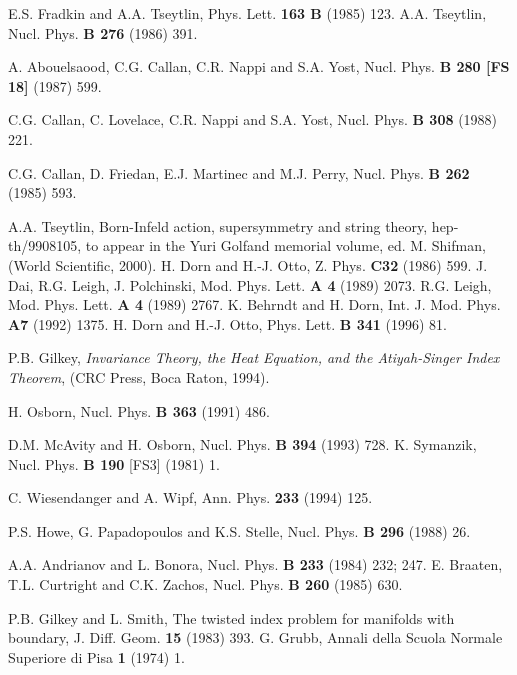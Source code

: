 \documentclass[a4paper,12pt]{article}
\begin{document}
\begin{thebibliography}{99}

E.S. Fradkin and A.A. Tseytlin, 
Phys. Lett. \textbf{163 B} (1985) 123. 
 A.A. Tseytlin, Nucl. Phys. \textbf{B 276} (1986) 391.

 A. Abouelsaood, C.G. Callan, C.R. Nappi and S.A. Yost, 
Nucl. Phys. \textbf{B
280 {[}FS 18{]}} (1987) 599.

C.G. Callan, C. Lovelace, C.R. Nappi and S.A. Yost,
Nucl. Phys. {\bf B 308} (1988) 221.

C.G. Callan, D. Friedan, E.J. Martinec and M.J. Perry, 
Nucl. Phys. \textbf{B 262} (1985) 593. 

A.A. Tseytlin, Born-Infeld action, 
supersymmetry and string theory, hep-th/9908105,
to appear in the Yuri Golfand memorial volume, ed. M. Shifman, 
(World Scientific,
2000).
H. Dorn and H.-J. Otto, Z. Phys. {\bf C32} (1986) 599.
J. Dai, R.G. Leigh, J. Polchinski, Mod. Phys. Lett. {\bf A 4}
(1989) 2073.
R.G. Leigh, Mod. Phys. Lett. {\bf A 4} (1989) 2767.
K. Behrndt and H. Dorn, Int. J. Mod. Phys. {\bf A7}
(1992) 1375.
H. Dorn and H.-J. Otto, Phys. Lett. {\bf B 341} (1996) 81.

 P.B. Gilkey, 
\textit{Invariance Theory, the Heat Equation, and the Atiyah-Singer
Index Theorem}, (CRC Press, Boca Raton, 1994).

H. Osborn, Nucl. Phys. {\bf B 363} (1991) 486.

D.M. McAvity and H. Osborn, Nucl. Phys. {\bf B 394} (1993) 728.
K. Symanzik, Nucl. Phys. {\bf B 190} [FS3] (1981) 1.

C. Wiesendanger and A. Wipf, Ann. Phys. {\bf 233} (1994)
125.

 P.S. Howe, G. Papadopoulos and K.S. Stelle,
Nucl. Phys. {\bf B 296} (1988) 26.


A.A. Andrianov and L. Bonora, 
Nucl. Phys. \textbf{B 233} (1984) 232; 247.
E. Braaten, T.L. Curtright and C.K. Zachos,
Nucl. Phys. {\bf B 260} (1985) 630.


 P.B. Gilkey and L. Smith, 
The twisted index problem for manifolds with boundary,
J. Diff. Geom. 
\textbf{15} (1983) 393.
G. Grubb, Annali della Scuola Normale Superiore di Pisa
{\bf 1} (1974) 1.


\end{thebibliography}
\end{document}
